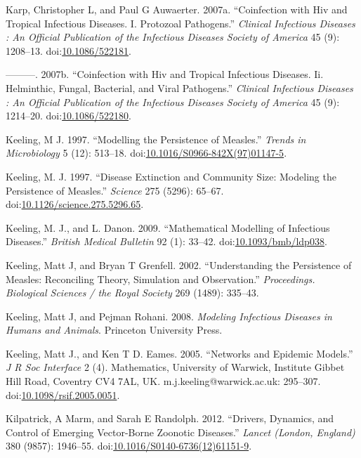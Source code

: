 \documentclass[]{book}
\theoremstyle{definition}
\theoremstyle{definition}
\theoremstyle{definition}
\theoremstyle{remark}
\begin{document}
\hypertarget{ref-karp07a}{}
Karp, Christopher L, and Paul G Auwaerter. 2007a. ``Coinfection with Hiv
and Tropical Infectious Diseases. I. Protozoal Pathogens.''
\emph{Clinical Infectious Diseases : An Official Publication of the
Infectious Diseases Society of America} 45 (9): 1208--13.
doi:\href{https://doi.org/10.1086/522181}{10.1086/522181}.

\hypertarget{ref-karp07}{}
---------. 2007b. ``Coinfection with Hiv and Tropical Infectious
Diseases. Ii. Helminthic, Fungal, Bacterial, and Viral Pathogens.''
\emph{Clinical Infectious Diseases : An Official Publication of the
Infectious Diseases Society of America} 45 (9): 1214--20.
doi:\href{https://doi.org/10.1086/522180}{10.1086/522180}.

\hypertarget{ref-keeling97}{}
Keeling, M J. 1997. ``Modelling the Persistence of Measles.''
\emph{Trends in Microbiology} 5 (12): 513--18.
doi:\href{https://doi.org/10.1016/S0966-842X(97)01147-5}{10.1016/S0966-842X(97)01147-5}.

\hypertarget{ref-keeling97a}{}
Keeling, M. J. 1997. ``Disease Extinction and Community Size: Modeling
the Persistence of Measles.'' \emph{Science} 275 (5296): 65--67.
doi:\href{https://doi.org/10.1126/science.275.5296.65}{10.1126/science.275.5296.65}.

\hypertarget{ref-keeling09}{}
Keeling, M. J., and L. Danon. 2009. ``Mathematical Modelling of
Infectious Diseases.'' \emph{British Medical Bulletin} 92 (1): 33--42.
doi:\href{https://doi.org/10.1093/bmb/ldp038}{10.1093/bmb/ldp038}.

\hypertarget{ref-keeling02}{}
Keeling, Matt J, and Bryan T Grenfell. 2002. ``Understanding the
Persistence of Measles: Reconciling Theory, Simulation and
Observation.'' \emph{Proceedings. Biological Sciences / the Royal
Society} 269 (1489): 335--43.

\hypertarget{ref-keeling08}{}
Keeling, Matt J, and Pejman Rohani. 2008. \emph{Modeling Infectious
Diseases in Humans and Animals}. Princeton University Press.

\hypertarget{ref-keeling05}{}
Keeling, Matt J., and Ken T D. Eames. 2005. ``Networks and Epidemic
Models.'' \emph{J R Soc Interface} 2 (4). Mathematics, University of
Warwick, Institute Gibbet Hill Road, Coventry CV4 7AL, UK.
m.j.keeling@warwick.ac.uk: 295--307.
doi:\href{https://doi.org/10.1098/rsif.2005.0051}{10.1098/rsif.2005.0051}.

\hypertarget{ref-kilpatrick12}{}
Kilpatrick, A Marm, and Sarah E Randolph. 2012. ``Drivers, Dynamics, and
Control of Emerging Vector-Borne Zoonotic Diseases.'' \emph{Lancet
(London, England)} 380 (9857): 1946--55.
doi:\href{https://doi.org/10.1016/S0140-6736(12)61151-9}{10.1016/S0140-6736(12)61151-9}.
\end{document}
